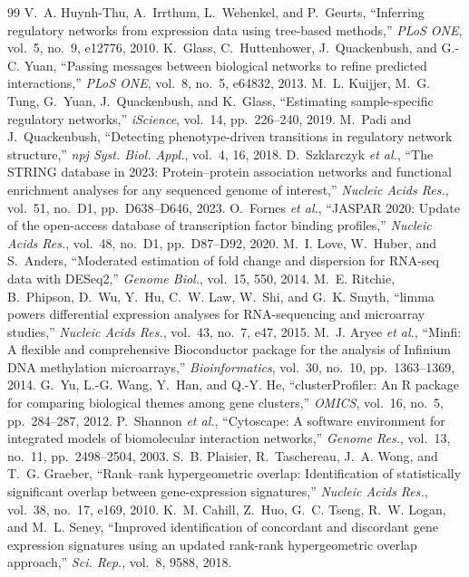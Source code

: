 \documentclass[journal]{IEEEtran}
\begin{document}
\begin{thebibliography}{99}
 V.~A. Huynh-Thu, A.~Irrthum, L.~Wehenkel, and P.~Geurts, ``Inferring regulatory networks from expression data using tree-based methods,'' \emph{PLoS ONE}, vol.~5, no.~9, e12776, 2010.
 K.~Glass, C.~Huttenhower, J.~Quackenbush, and G.-C. Yuan, ``Passing messages between biological networks to refine predicted interactions,'' \emph{PLoS ONE}, vol.~8, no.~5, e64832, 2013.
 M.~L. Kuijjer, M.~G. Tung, G.~Yuan, J.~Quackenbush, and K.~Glass, ``Estimating sample-specific regulatory networks,'' \emph{iScience}, vol.~14, pp.~226--240, 2019.
 M.~Padi and J.~Quackenbush, ``Detecting phenotype-driven transitions in regulatory network structure,'' \emph{npj Syst. Biol. Appl.}, vol.~4, 16, 2018.
 D.~Szklarczyk \emph{et al.}, ``The STRING database in 2023: Protein--protein association networks and functional enrichment analyses for any sequenced genome of interest,'' \emph{Nucleic Acids Res.}, vol.~51, no.~D1, pp.~D638--D646, 2023.
 O.~Fornes \emph{et al.}, ``JASPAR 2020: Update of the open-access database of transcription factor binding profiles,'' \emph{Nucleic Acids Res.}, vol.~48, no.~D1, pp.~D87--D92, 2020.
 M.~I. Love, W.~Huber, and S.~Anders, ``Moderated estimation of fold change and dispersion for RNA-seq data with DESeq2,'' \emph{Genome Biol.}, vol.~15, 550, 2014.
 M.~E. Ritchie, B.~Phipson, D.~Wu, Y.~Hu, C.~W. Law, W.~Shi, and G.~K. Smyth, ``limma powers differential expression analyses for RNA-sequencing and microarray studies,'' \emph{Nucleic Acids Res.}, vol.~43, no.~7, e47, 2015.
 M.~J. Aryee \emph{et al.}, ``Minfi: A flexible and comprehensive Bioconductor package for the analysis of Infinium DNA methylation microarrays,'' \emph{Bioinformatics}, vol.~30, no.~10, pp.~1363--1369, 2014.
 G.~Yu, L.-G. Wang, Y.~Han, and Q.-Y. He, ``clusterProfiler: An R package for comparing biological themes among gene clusters,'' \emph{OMICS}, vol.~16, no.~5, pp.~284--287, 2012.
 P.~Shannon \emph{et al.}, ``Cytoscape: A software environment for integrated models of biomolecular interaction networks,'' \emph{Genome Res.}, vol.~13, no.~11, pp.~2498--2504, 2003.
 S.~B. Plaisier, R.~Taschereau, J.~A. Wong, and T.~G. Graeber, ``Rank--rank hypergeometric overlap: Identification of statistically significant overlap between gene-expression signatures,'' \emph{Nucleic Acids Res.}, vol.~38, no.~17, e169, 2010.
 K.~M. Cahill, Z.~Huo, G.~C. Tseng, R.~W. Logan, and M.~L. Seney, ``Improved identification of concordant and discordant gene expression signatures using an updated rank-rank hypergeometric overlap approach,'' \emph{Sci. Rep.}, vol.~8, 9588, 2018.

\end{thebibliography}
\end{document}
